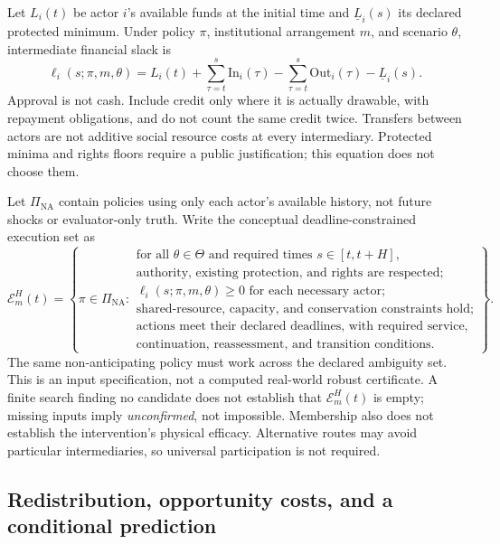 \documentclass[11pt,a4paper]{article}
\numberwithin{equation}{section}
\theoremstyle{definition}
\theoremstyle{plain}
\theoremstyle{remark}
\begin{document}
Let $L_i(t)$ be actor $i$'s available funds at the initial time and $\underline L_i(s)$ its declared protected minimum. Under policy $\pi$, institutional arrangement $m$, and scenario $\theta$, intermediate financial slack is
\begin{equation}
\ell_i(s;\pi,m,\theta)=L_i(t)+
\sum_{\tau=t}^{s}\mathrm{In}_i(\tau)-
\sum_{\tau=t}^{s}\mathrm{Out}_i(\tau)-\underline L_i(s).
\label{eq:liquidityslack}
\end{equation}
Approval is not cash. Include credit only where it is actually drawable, with repayment obligations, and do not count the same credit twice. Transfers between actors are not additive social resource costs at every intermediary. Protected minima and rights floors require a public justification; this equation does not choose them.

Let $\Pi_{\mathrm{NA}}$ contain policies using only each actor's available history, not future shocks or evaluator-only truth. Write the conceptual deadline-constrained execution set as
\begin{equation}
\mathcal E_m^H(t)=\left\{\pi\in\Pi_{\mathrm{NA}}:
\begin{array}{l}
\text{for all }\theta\in\Theta\text{ and required times }s\in[t,t+H],\\
\text{authority, existing protection, and rights are respected;}\\
\ell_i(s;\pi,m,\theta)\ge0\text{ for each necessary actor;}\\
\text{shared-resource, capacity, and conservation constraints hold;}\\
\text{actions meet their declared deadlines, with required service,}\\
\text{continuation, reassessment, and transition conditions.}
\end{array}\right\}.
\label{eq:executionset}
\end{equation}
The same non-anticipating policy must work across the declared ambiguity set. This is an input specification, not a computed real-world robust certificate. A finite search finding no candidate does not establish that $\mathcal E_m^H(t)$ is empty; missing inputs imply \emph{unconfirmed}, not impossible. Membership also does not establish the intervention's physical efficacy. Alternative routes may avoid particular intermediaries, so universal participation is not required.

\subsection{Redistribution, opportunity costs, and a conditional prediction}
\end{document}
